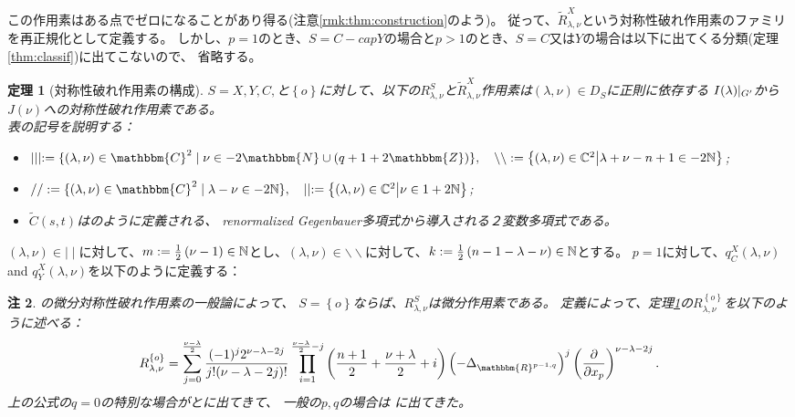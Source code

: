 \documentclass[12pt]{article} %
\newcommand{\assign}{:=}
\newtheorem{theorem}{定理}
\newtheorem{remark}[theorem]{注}
\theoremstyle{definition}
\theoremstyle{exampstyle} \newtheorem{examp}[theorem]{Theorem}
\newcommand{\IlambdaGprime}{I(\lambda)\kern-0.3em\mid_{G'}}
\newcommand{\bb}{\backslash\backslash}
\begin{document}
この作用素はある点でゼロになることがあり得る(注意\ref{rmk:thm:construction}のよう)。
従って、$\tilde{R}^X_{\lambda,\nu}$という対称性破れ作用素のファミリを再正規化として定義する。
しかし、$p=1$のとき、$S=C-cap Y$の場合と$p>1$のとき、$S=C$又は$Y$の場合は以下に出てくる分類(定理\ref{thm:classif})に出てこないので、
省略する。
\newpage
\begin{theorem}[対称性破れ作用素の構成]\label{thm:construction}
	$S=X,Y,C,$と$\left\{ o \right\}$に対して、以下の$R_{\lambda,\nu}^S$と$\tilde{R}_{\lambda,\nu}^X$作用素は$(\lambda,\nu)\in D_S$に正則に依存する
	$\IlambdaGprime$から$J(\nu)$への対称性破れ作用素である。\\
\vspace{\baselineskip}
表の記号を説明する：
\begin{itemize}
	\item $\mid \mid \mid \assign \{ (\lambda, \nu) \in \mathbbm{C}^2 \mid \nu \in
	- 2\mathbbm{N} \cup (q + 1 + 2\mathbbm{Z}) \},\quad \backslash\backslash:=\mysetn{(\lambda,\nu)\in\C^2}{\lambda+\nu-n+1\in-2\N}$;
\item $/ / \assign
\{ (\lambda, \nu) \in \mathbbm{C}^2 \mid \lambda - \nu \in
-2\N \},\quad \mid\mid:=\mysetn{(\lambda,\nu)\in\C^2}{\nu\in1+2\N}$;
\item $\tilde{C}(s,t)$は\cite[(16.3)]{kobayashi2015symmetry}のように定義される、
	renormalized Gegenbauer多項式から導入される２変数多項式である。
\end{itemize}
\end{theorem}
$(\lambda,\nu)\in\mid\mid$に対して、$m:=\frac{1}{2}\left( \nu-1 \right)\in\mathbb{N}$とし、$(\lambda,\nu)\in\bb$に対して、$k:=\frac{1}{2}\left( n-1-\lambda-\nu \right)\in\mathbb{N}$とする。
$p=1$に対して、$q_C^X(\lambda,\nu)$ and $q_Y^X(\lambda,\nu)$を以下のように定義する：
\begin{remark}
	\cite[Chap.\ 2]{kobayashi2016differential1}の微分対称性破れ作用素の一般論によって、
	$S=\left\{ o \right\}$ならば、$R_{\lambda,\nu}^S$は微分作用素である。
	定義によって、定理\ref{thm:construction}の$R_{\lambda,\nu}^{ \left\{ o \right\}}$を以下のように述べる：
	\begin{equation*}
		R_{\lambda,\nu}^{ \left\{ o \right\}}=
		\sum_{j=0}^{\frac{\nu-\lambda}{2}}\frac{(-1)^j2^{\nu-\lambda-2j}}{j!(\nu-\lambda-2j)!}\prod_{i=1}^{\frac{\nu-\lambda}{2}-j}\left( \frac{n
		+1}{2}+\frac{\nu+\lambda}{2}
		+i \right)\left(- \Delta_{\mathbbm{R}^{p-1,q}} \right)^j\left( \frac{\partial}{\partial x_p} \right)^{\nu-\lambda-2j}.
	\end{equation*}
	上の公式の$q=0$の特別な場合が\cite[Thms. 5.1.1 and 5.2.1]{juhl2009families}と\cite[(10.1)]{kobayashi2015symmetry}に出てきて、
	一般の$p,q$の場合は
	\cite[Thm.\ 4.3]{kobayashi2015branching}に出てきた。
\end{remark}
\end{document}
